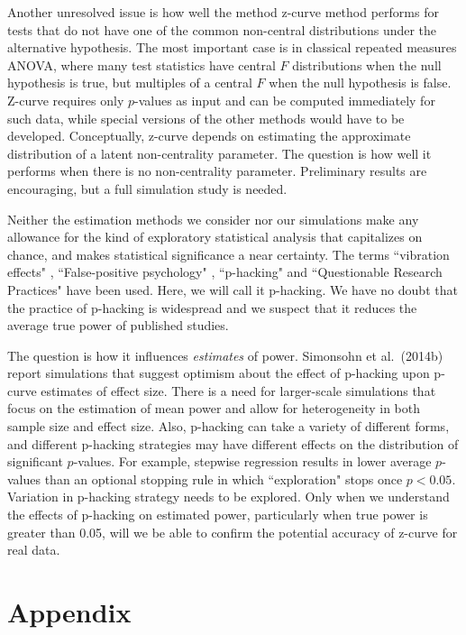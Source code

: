 \documentclass[jou]{apa6} %
\begin{document}
Another unresolved issue is how well the method z-curve method performs for tests that do not have one of the common non-central distributions under the alternative hypothesis. The most important case is in classical repeated measures ANOVA, where many test statistics have central $F$ distributions when the null hypothesis is true, but multiples of a central $F$ when the null hypothesis is false. Z-curve requires only $p$-values as input and can be computed immediately for such data, while special versions of the other methods would have to be developed. Conceptually, z-curve depends on estimating the approximate distribution of a latent non-centrality parameter. The question is how well it performs when there is no non-centrality parameter. Preliminary results are encouraging, but a full simulation study is needed. 

Neither the estimation methods we consider nor our simulations make any allowance for the kind of exploratory statistical analysis that capitalizes on chance, and makes statistical significance a near certainty. The terms ``vibration effects" \parencite{Ioannidis2008}, ``False-positive psychology" \parencite{SimmonsEtAl2011}, ``p-hacking" \parencite{SimonsohnEtAl2014a} and ``Questionable Research Practices" \parencite{uli2012} have been used. Here, we will call it p-hacking. We have no doubt that the practice of p-hacking is widespread and we suspect that it reduces the average true power of published studies. 

The question is how it influences \emph{estimates} of power. Simonsohn et al.~(2014b) report simulations that suggest optimism about the effect of p-hacking upon p-curve estimates of effect size. There is a need for larger-scale simulations that focus on the estimation of mean power and allow for heterogeneity in both sample size and effect size. Also, p-hacking can take a variety of different forms, and different p-hacking strategies may have different effects on the distribution of significant $p$-values. For example, stepwise regression results in lower average $p$-values than an optional stopping rule in which ``exploration" stops once $p < 0.05$. Variation in p-hacking strategy needs to be explored. Only when we understand the effects of p-hacking on estimated power, particularly when true power is greater than 0.05, will we be able to confirm the potential accuracy of z-curve for real data.


\printbibliography

\section{Appendix}
\end{document}
